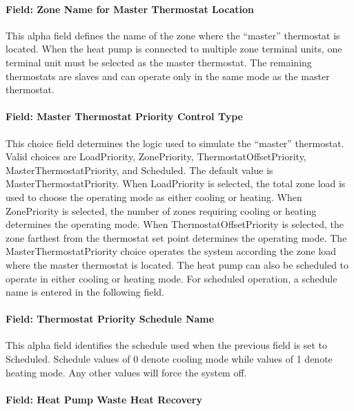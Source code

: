 \paragraph{Field: Zone Name for Master Thermostat Location}\label{field-zone-name-for-master-thermostat-location}

This alpha field defines the name of the zone where the ``master'' thermostat is located. When the heat pump is connected to multiple zone terminal units, one terminal unit must be selected as the master thermostat. The remaining thermostats are slaves and can operate only in the same mode as the master thermostat.

\paragraph{Field: Master Thermostat Priority Control Type}\label{field-master-thermostat-priority-control-type}

This choice field determines the logic used to simulate the ``master'' thermostat. Valid choices are LoadPriority, ZonePriority, ThermostatOffsetPriority, MasterThermostatPriority, and Scheduled. The default value is MasterThermostatPriority. When LoadPriority is selected, the total zone load is used to choose the operating mode as either cooling or heating. When ZonePriority is selected, the number of zones requiring cooling or heating determines the operating mode. When ThermostatOffsetPriority is selected, the zone farthest from the thermostat set point determines the operating mode. The MasterThermostatPriority choice operates the system according the zone load where the master thermostat is located. The heat pump can also be scheduled to operate in either cooling or heating mode. For scheduled operation, a schedule name is entered in the following field.

\paragraph{Field: Thermostat Priority Schedule Name}\label{field-thermostat-priority-schedule-name}

This alpha field identifies the schedule used when the previous field is set to Scheduled. Schedule values of 0 denote cooling mode while values of 1 denote heating mode. Any other values will force the system off.

\paragraph{Field: Heat Pump Waste Heat Recovery}\label{field-heat-pump-waste-heat-recovery}

